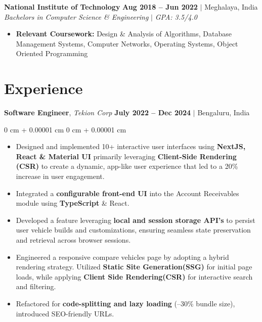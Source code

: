 \documentclass[10pt, letterpaper]{article}
\newenvironment{highlights}{
    \begin{itemize}[
        topsep=0.10 cm,     %
        parsep=0.10 cm,     %
        partopsep=0pt,      %
        itemsep=0pt,        %
        leftmargin=0 cm + 10pt  %
    ]
}{
    \end{itemize}
}
\newenvironment{onecolentry}{
    \begin{adjustwidth}{
        0 cm + 0.00001 cm
    }{
        0 cm + 0.00001 cm
    }
}{
    \end{adjustwidth}
}
\begin{document}
        \vspace{0.1cm}
        
        \noindent
        \textbf{National Institute of Technology} \hfill {\color{darkgray}\small{\textbf{Aug 2018 – Jun 2022} $|$ Meghalaya, India}} \\
        {\color{darkgray}\textit{Bachelors in Computer Science \& Engineering}} $|$ \textit{GPA: 3.5/4.0}
        \begin{highlights}
            \item \textbf{Relevant Coursework:} Design \& Analysis of Algorithms, Database Management Systems, Computer Networks, Operating Systems, Object Oriented Programming
        \end{highlights}



    
    \section{Experience}

        \noindent
        \textbf{Software Engineer}, {\color{darkgray}\textit{Tekion Corp}} \hfill {\color{darkgray}\small{\textbf{July 2022 – Dec 2024} $|$ Bengaluru, India }}

        \vspace{0.20 cm}
        \begin{onecolentry}
            \begin{highlights}
                \item Designed and implemented 10+ interactive user interfaces using \textbf{NextJS, React \& Material UI} primarily leveraging \textbf{Client-Side Rendering (CSR)} to create a dynamic, app-like user experience that led to a 20\% increase in user engagement.
                \item Integrated a \textbf{configurable front-end UI} into the Account Receivables module using \textbf{TypeScript} \& React.
                \item  Developed a feature leveraging \textbf{local and session storage API's} to persist user vehicle builds and customizations, ensuring seamless state preservation and retrieval across browser sessions.
                \item Engineered a responsive compare vehicles page by adopting a hybrid rendering strategy. Utilized \textbf{Static Site Generation(SSG)} for initial page loads, while applying \textbf{Client Side Rendering(CSR)} for interactive search and filtering.
                \item Refactored for \textbf{code-splitting and lazy loading} (–30\% bundle size), introduced SEO-friendly URLs.
            \end{highlights}
        \end{onecolentry}
\end{document}
